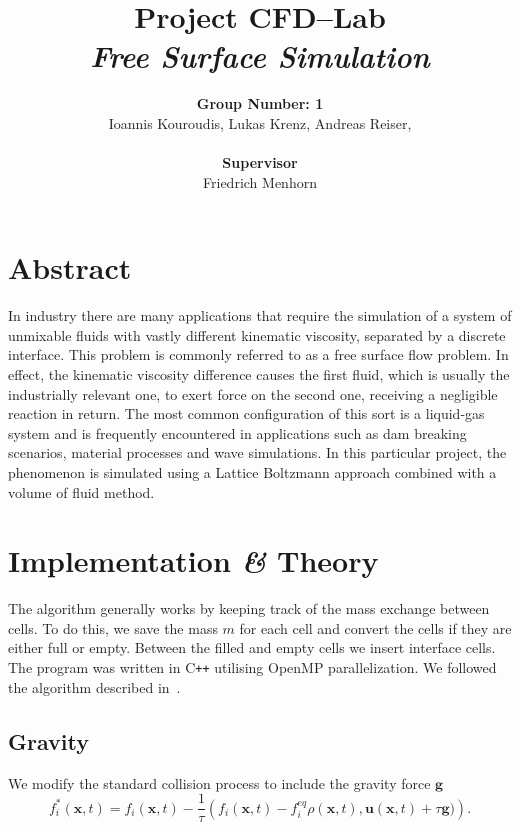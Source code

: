 \documentclass[10pt,a4paper,notitlepage]{article}
\begin{document}
\title{Project CFD--Lab\\ \textit{Free Surface Simulation}}
\author{\textbf{Group Number: 1}\\Ioannis Kouroudis, Lukas Krenz, Andreas Reiser,  \\ \\\textbf{Supervisor}\\Friedrich Menhorn}
\maketitle
\section*{Abstract}
In industry there are many applications that require the simulation of a system of unmixable fluids with vastly different kinematic viscosity, separated by a discrete interface.  This problem is commonly referred to as a free surface flow problem. In effect, the kinematic viscosity difference causes the first fluid, which is usually the industrially relevant one, to exert force on the second one, receiving a negligible reaction in return. The most common configuration of this sort is a liquid-gas system and is frequently encountered in applications such as dam breaking scenarios, material processes and wave simulations.
In this particular project, the phenomenon is simulated  using a Lattice Boltzmann approach combined with a volume of fluid method.
        
\section{Implementation \textit{\&} Theory}
The algorithm generally works by keeping track of the mass exchange between cells.
To do this, we save the mass $m$ for each cell and convert the cells if they are either full or empty.
Between the filled and empty cells we insert interface cells.
The program was written in C\texttt{++} utilising OpenMP parallelization.
We followed the algorithm described in~\cite{thurey2007physically}.

\subsection{Gravity }
We modify the standard collision process to include the gravity force $\bm{g}$~\cite{thurey2006optimization}
\begin{equation}\label{eq:BGK}
f_{i}^*(\bm{x},t) =f_i (\bm{x}, t) - \frac{1}{\tau} \left( f_i(\bm{x}, t) - f_{i}^{eq}\rho(\bm{x},t),\mathbf{u}(\bm{x},t)+\tau \bm{g}) \right).
\end{equation}
\end{document}
